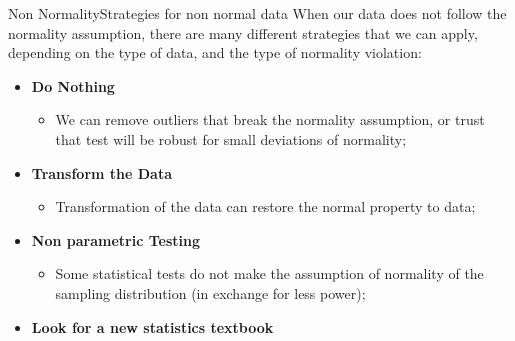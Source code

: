 

\begin{frame}{Non Normality}{Strategies for non normal data}
  When our data does not follow the normality assumption, there are many different strategies that we can apply, depending on the type of data, and the type of normality violation:\bigskip

  \begin{itemize}
    \item {\bf Do Nothing}
    \begin{itemize}
      \item We can remove outliers that break the normality assumption, or trust that test will be robust for small deviations of normality;
    \end{itemize}
    \item {\bf Transform the Data}
      \begin{itemize}
        \item Transformation of the data can restore the normal property to data;
      \end{itemize}
    \item {\bf Non parametric Testing}
    \begin{itemize}
      \item Some statistical tests do not make the assumption of normality of the sampling distribution (in exchange for less power);
    \end{itemize}
    \item {\bf Look for a new statistics textbook}
  \end{itemize}\bigskip

\end{frame}

